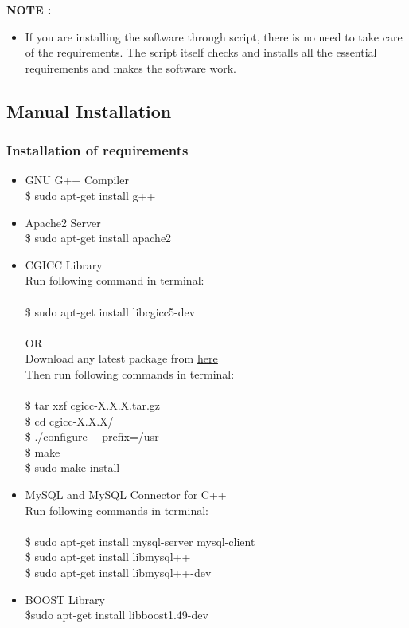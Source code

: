 {\bf NOTE :}
\begin{itemize}
\item If you are installing the software through script, there is no need to take care of the requirements. The script itself checks and installs all the essential requirements and makes the software work.
\end{itemize}
\subsection{Manual Installation}
\vskip 0.5cm

\subsubsection{Installation of requirements}
\vskip 0.5cm
\begin{itemize}

\item GNU G++ Compiler\\
\tab \$ sudo apt-get install g++\\

\item Apache2 Server\\
\tab \$ sudo apt-get install apache2\\

\item CGICC Library\\
\tab Run following command in terminal:\\\\
\tab \$ sudo apt-get install libcgicc5-dev\\\\
OR\\
\tab Download any latest package from
\href{http://ftp.gnu.org/gnu/cgicc/}{\underline{here}}\\
\tab Then run following commands in terminal:\\\\
\tab \$ tar xzf cgicc-X.X.X.tar.gz\\ 
\tab \$ cd cgicc-X.X.X/ \\
\tab \$ ./configure - -prefix=/usr\\ 
\tab \$ make\\
\tab \$ sudo make install\\

\item  MySQL and MySQL Connector for C++\\
\tab Run following commands in terminal:\\\\
\tab \$ sudo apt-get install mysql-server mysql-client \\
\tab \$ sudo apt-get install libmysql++ \\
\tab \$ sudo apt-get install libmysql++-dev \\
\item BOOST Library\\
\tab \$sudo apt-get install libboost1.49-dev \\


\end{itemize}
